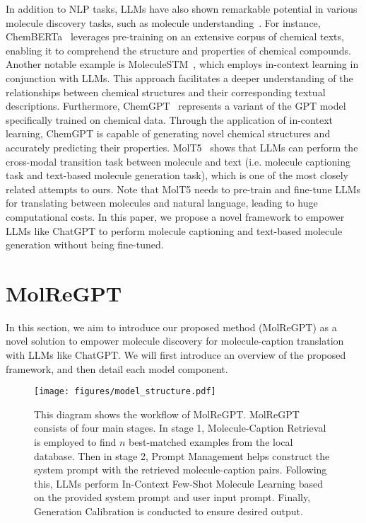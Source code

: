 \documentclass{article}
\theoremstyle{plain}
\theoremstyle{definition}
\theoremstyle{remark}
\begin{document}
In addition to NLP tasks, LLMs have also shown remarkable potential in various molecule discovery tasks, such as molecule understanding~\cite{bran2023chemcrow,white2023future}. For instance, ChemBERTa~\cite{chithrananda2020chemberta} leverages pre-training on an extensive corpus of chemical texts, enabling it to comprehend the structure and properties of chemical compounds. Another notable example is MoleculeSTM~\cite{liu2022multi}, which employs in-context learning in conjunction with LLMs. This approach facilitates a deeper understanding of the relationships between chemical structures and their corresponding textual descriptions. 
Furthermore, ChemGPT~\cite{frey2022neural} represents a variant of the GPT model specifically trained on chemical data. Through the application of in-context learning, ChemGPT is capable of generating novel chemical structures and accurately predicting their properties.
MolT5~\cite{edwards-etal-2022-translation} shows that LLMs can perform the cross-modal transition task between molecule and text (i.e. molecule captioning task and text-based molecule generation task), which is one of the most closely related attempts to ours. 
Note that MolT5 needs to pre-train and fine-tune LLMs for translating between molecules and natural language, leading to huge computational costs. In this paper, we propose a novel framework to empower LLMs like ChatGPT to perform molecule captioning and text-based molecule generation without being fine-tuned.  \section{MolReGPT}
\label{sec:methodlogy}

In this section, we aim to introduce our proposed method (MolReGPT) as a novel solution to empower molecule discovery for molecule-caption translation with LLMs like ChatGPT.
We will first introduce an overview of the proposed framework, and then detail each model component.

\begin{figure*}[htb]
    \centering
    \texttt{[image: figures/model\_structure.pdf]}
    \caption{This diagram shows the workflow of MolReGPT. MolReGPT consists of four main stages. 
    In stage 1, Molecule-Caption Retrieval is employed to find \(n\) best-matched examples from the local database. 
    Then in stage 2, Prompt Management helps construct the system prompt with the retrieved molecule-caption pairs. Following this, LLMs perform In-Context Few-Shot Molecule Learning based on the provided system prompt and user input prompt. 
    Finally, Generation Calibration is conducted to ensure desired output.}
    \label{fig:prompt}
\end{figure*}
\end{document}
